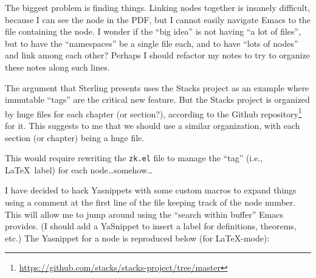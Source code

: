 \begin{node}\label{amn-0005}%
The biggest problem is finding things. Linking nodes together is
insanely difficult, because I can see the node in the PDF, but I cannot
easily navigate Emacs to the file containing the node. I wonder if the
``big idea'' is not having ``a lot of files'', but to have the
``namespaces'' be a single file each, and to have ``lots of nodes'' and
link among each other? Perhaps I should refactor my notes to try to
organize these notes along such lines.

The argument that Sterling presents uses the Stacks project as an
example where immutable ``tags'' are the critical new feature. But the
Stacks project is organized by huge files for each chapter (or
section?), according to the Github repository\footnote{\url{https://github.com/stacks/stacks-project/tree/master}} for it.
This suggests to me that we should use a similar organization, with each
section (or chapter) being a huge file.

This would require rewriting the \verb|zk.el| file to manage the ``tag''
(i.e., \LaTeX\ label) for each node\dots somehow\dots

\begin{node}\label{amn-0006}%
I have decided to hack Yasnippets with some custom macros to expand
things using a comment at the first line of the file keeping track of
the node number. This will allow me to jump around using the ``search
within buffer'' Emacs provides. (I should add a YaSnippet to insert a
label for definitions, theorems, etc.) The Yasnippet for a node is reproduced
below (for \LaTeX-mode):

%
\end{node}
\end{node}
